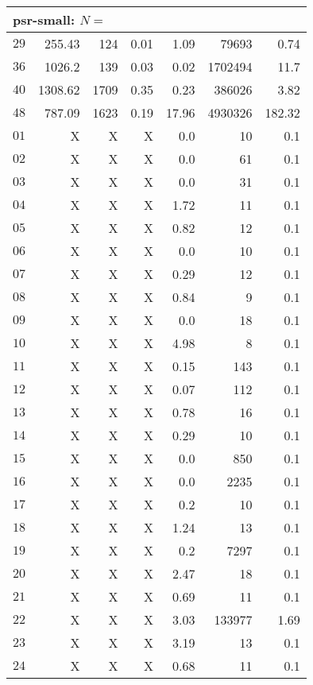 \begin{longtable}{|c||r|r|r||r|r|r|}
\multicolumn{7}{|l|}{psr-small: $N=$}\\\hline
$29$ & 255.43 & 124 & 0.01 & 1.09 & 79693 & 0.74 \\\hline
$36$ & 1026.2 & 139 & 0.03 & 0.02 & 1702494 & 11.7 \\\hline
$40$ & 1308.62 & 1709 & 0.35 & 0.23 & 386026 & 3.82 \\\hline
$48$ & 787.09 & 1623 & 0.19 & 17.96 & 4930326 & 182.32 \\\hline
$01$ &  X &  X &  X & 0.0 & 10 & 0.1 \\\hline
$02$ &  X &  X &  X & 0.0 & 61 & 0.1 \\\hline
$03$ &  X &  X &  X & 0.0 & 31 & 0.1 \\\hline
$04$ &  X &  X &  X & 1.72 & 11 & 0.1 \\\hline
$05$ &  X &  X &  X & 0.82 & 12 & 0.1 \\\hline
$06$ &  X &  X &  X & 0.0 & 10 & 0.1 \\\hline
$07$ &  X &  X &  X & 0.29 & 12 & 0.1 \\\hline
$08$ &  X &  X &  X & 0.84 & 9 & 0.1 \\\hline
$09$ &  X &  X &  X & 0.0 & 18 & 0.1 \\\hline
$10$ &  X &  X &  X & 4.98 & 8 & 0.1 \\\hline
$11$ &  X &  X &  X & 0.15 & 143 & 0.1 \\\hline
$12$ &  X &  X &  X & 0.07 & 112 & 0.1 \\\hline
$13$ &  X &  X &  X & 0.78 & 16 & 0.1 \\\hline
$14$ &  X &  X &  X & 0.29 & 10 & 0.1 \\\hline
$15$ &  X &  X &  X & 0.0 & 850 & 0.1 \\\hline
$16$ &  X &  X &  X & 0.0 & 2235 & 0.1 \\\hline
$17$ &  X &  X &  X & 0.2 & 10 & 0.1 \\\hline
$18$ &  X &  X &  X & 1.24 & 13 & 0.1 \\\hline
$19$ &  X &  X &  X & 0.2 & 7297 & 0.1 \\\hline
$20$ &  X &  X &  X & 2.47 & 18 & 0.1 \\\hline
$21$ &  X &  X &  X & 0.69 & 11 & 0.1 \\\hline
$22$ &  X &  X &  X & 3.03 & 133977 & 1.69 \\\hline
$23$ &  X &  X &  X & 3.19 & 13 & 0.1 \\\hline
$24$ &  X &  X &  X & 0.68 & 11 & 0.1 \\\hline

\end{longtable}
